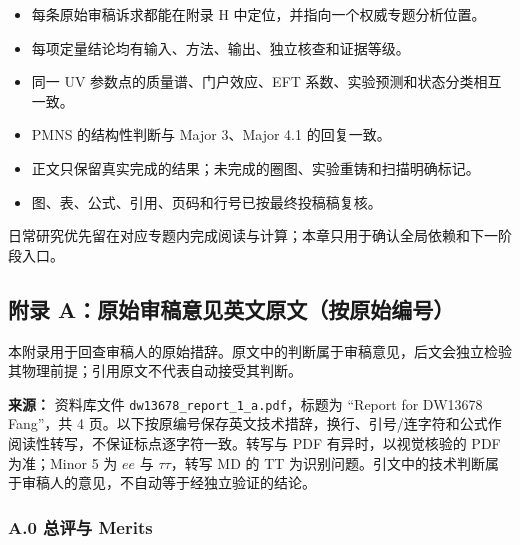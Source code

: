 \documentclass[
]{article}
\providecommand{\tightlist}{%
  \setlength{\itemsep}{0pt}\setlength{\parskip}{0pt}}
\begin{document}
\begin{itemize}
\tightlist
\item[$\square$]
  每条原始审稿诉求都能在附录 H 中定位，并指向一个权威专题分析位置。
\item[$\square$]
  每项定量结论均有输入、方法、输出、独立核查和证据等级。
\item[$\square$]
  同一 UV 参数点的质量谱、门户效应、EFT
  系数、实验预测和状态分类相互一致。
\item[$\square$]
  PMNS 的结构性判断与 Major 3、Major 4.1 的回复一致。
\item[$\square$]
  正文只保留真实完成的结果；未完成的圈图、实验重铸和扫描明确标记。
\item[$\square$]
  图、表、公式、引用、页码和行号已按最终投稿稿复核。
\end{itemize}

日常研究优先留在对应专题内完成阅读与计算；本章只用于确认全局依赖和下一阶段入口。

\subsection{附录
A：原始审稿意见英文原文（按原始编号）}\label{ux9644ux5f55-aux539fux59cbux5ba1ux7a3fux610fux89c1ux82f1ux6587ux539fux6587ux6309ux539fux59cbux7f16ux53f7}

本附录用于回查审稿人的原始措辞。原文中的判断属于审稿意见，后文会独立检验其物理前提；引用原文不代表自动接受其判断。

\textbf{来源：} 资料库文件 \texttt{dw13678\_report\_1\_a.pdf}，标题为
``Report for DW13678 Fang''，共 4
页。以下按原编号保存英文技术措辞，换行、引号/连字符和公式作阅读性转写，不保证标点逐字符一致。转写与
PDF 有异时，以视觉核验的 PDF 为准；Minor 5 为 \(ee\) 与
\(\tau\tau\)，转写 MD 的 TT
为识别问题。引文中的技术判断属于审稿人的意见，不自动等于经独立验证的结论。

\subsubsection{A.0 总评与 Merits}\label{a.0-ux603bux8bc4ux4e0e-merits}
\end{document}
